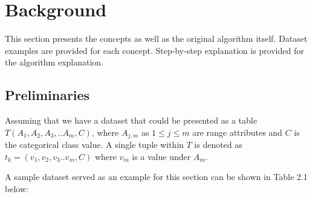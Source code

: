 \chapter{Background}

This section presents the concepts as well as the original algorithm itself. Dataset examples are provided for each concept. Step-by-step explanation is provided for the algorithm explanation.

\section{Preliminaries}

Assuming that we have a dataset that could be presented as a table $T(A_1, A_2, A_3,..A_m, C)$, where $A_{j,m}$ as $1 \leq j \leq m$ are range attributes and $C$ is the categorical class value. A single tuple within $T$ is denoted as $t_k = (v_1,v_2,v_3..v_m,C)$ where $v_m$ is a value under $A_m$.

A sample dataset served as an example for this section can be shown in Table 2.1 below: 

 

